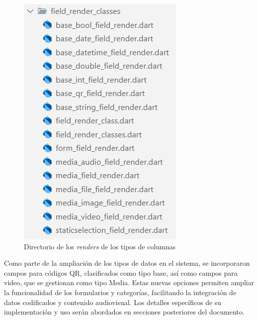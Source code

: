 \documentclass[12pt, a4paper]{book}
\begin{document}
\begin{figure}[H]
\begin{minipage}[b]{0.3\textwidth}
    \includegraphics[width=\textwidth]{images/field_renders.jpg}
    \caption{Directorio de los \textit{renders} de los tipos de columnas}
    \label{fig:fieldrender}
  \end{minipage}
\end{figure}

Como parte de la ampliación de los tipos de datos en el sistema, se incorporaron campos para códigos QR, clasificados como tipo base, así como campos para video, que se gestionan como tipo Media. Estas nuevas opciones permiten ampliar la funcionalidad de los formularios y categorías, facilitando la integración de datos codificados y contenido audiovisual. Los detalles específicos de su implementación y uso serán abordados en secciones posteriores del documento.
\end{document}
